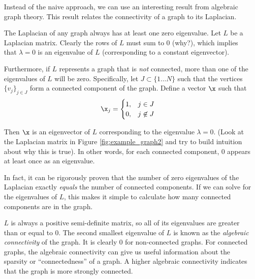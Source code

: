 Instead of the naive approach, we can use an interesting result from algebraic graph theory. 
This result relates the connectivity of a graph to its Laplacian.

The Laplacian of any graph always has at least one zero eigenvalue.
Let $L$ be a Laplacian matrix.
Clearly the rows of $L$ must sum to 0 (why?), which implies that $\lambda = 0$ is an eigenvalue of $L$ (corresponding to a constant eigenvector). 

Furthermore, if $L$ represents a graph that is \textit{not} connected, more than one of the eigenvalues of $L$ will be zero. 
Specifically, let $J \subset \{1 \dots N\}$ such that the vertices $\{v_j\}_{j \in J}$ form a connected component of the graph. 
Define a vector $\x$ such that
 \[
    \x_j = \begin{cases}
        1, & j \in J \\
        0, & j \not\in J
        \end{cases}
  \]

Then $\x$ is an eigenvector of $L$ corresponding to the eigenvalue $\lambda = 0$. 
(Look at the Laplacian matrix in Figure \ref{fig:example_graph2} and try to build intuition about why this is true). 
In other words, for each connected component, 0 appears at least once as an eigenvalue.

In fact, it can be rigorously proven that the number of zero eigenvalues of the Laplacian exactly \textit{equals} the number of connected components. 
If we can solve for the eigenvalues of $L$, this makes it simple to calculate how many connected components are in the graph.

$L$ is always a positive semi-definite matrix, so all of its eigenvalues are greater than or equal to 0.
The second smallest eigenvalue of $L$ is known as the \textit{algebraic connectivity} of the graph.
It is clearly 0 for non-connected graphs.
For connected graphs, the algebraic connectivity can give us useful information about the sparsity or ``connectedness'' of a graph.
A higher algebraic connectivity indicates that the graph is more strongly connected.

